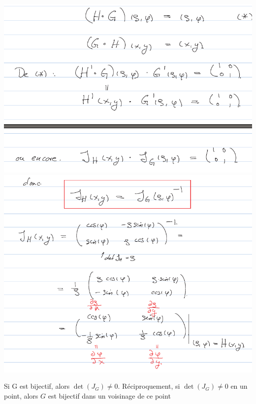 \documentclass[12pt,a4paper]{article}
\begin{document}
\begin{enumerate}[label=\roman*)]
\begin{center}
				\includegraphics[scale=0.7]{images/ou_encore}
				\includegraphics[scale=0.7]{images/donc}
				\begin{boite}
					 Si G est bijectif, alors $\det(J_G) \neq 0$. Réciproquement, si $\det(J_G) \neq 0$ en un point, alors $G$ est bijectif dans un voisinage de ce point
				\end{boite}

\end{center}
\end{enumerate}
\end{document}
